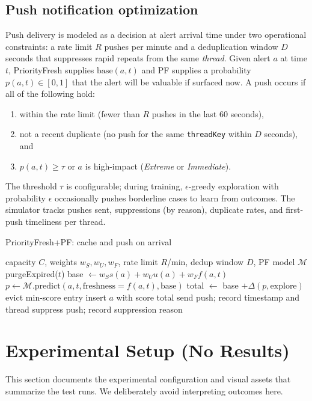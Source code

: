 \documentclass[11pt,twocolumn]{article}
\begin{document}
\subsection{Push notification optimization}
\label{sec:push-optimization}
Push delivery is modeled as a decision at alert arrival time under two operational constraints: a rate limit $R$ pushes per minute and a deduplication window $D$ seconds that suppresses rapid repeats from the same \emph{thread}. Given alert $a$ at time $t$, PriorityFresh supplies $\mathrm{base}(a,t)$ and PF supplies a probability $p(a,t) \in [0,1]$ that the alert will be valuable if surfaced now. A push occurs if all of the following hold:
\begin{enumerate}
        \item within the rate limit (fewer than $R$ pushes in the last 60 seconds),
        \item not a recent duplicate (no push for the same \texttt{threadKey} within $D$ seconds), and
        \item $p(a,t) \ge \tau$ or $a$ is high-impact (\emph{Extreme} or \emph{Immediate}).
\end{enumerate}
The threshold $\tau$ is configurable; during training, $\epsilon$-greedy exploration with probability $\epsilon$ occasionally pushes borderline cases to learn from outcomes. The simulator tracks pushes sent, suppressions (by reason), duplicate rates, and first-push timeliness per thread.

\begin{algorithm}[t]
\caption{PriorityFresh+PF: cache and push on arrival}
\label{alg:pf-priorityfresh}
\begin{algorithmic}[1]
\REQUIRE capacity $C$, weights $w_S,w_U,w_F$, rate limit $R$/min, dedup window $D$, PF model $\mathcal{M}$
\STATE purgeExpired($t$)
\STATE base $\leftarrow w_S s(a)+ w_U u(a)+ w_F f(a,t)$
\STATE $p \leftarrow \mathcal{M}.\text{predict}(a, t, \text{freshness}=f(a,t), \text{base})$
\STATE total $\leftarrow$ base $+ \Delta(p,\text{explore})$
 \STATE evict min-score entry \ENDIF
\STATE insert $a$ with score total
    \STATE send push; record timestamp and thread
\ELSE
    \STATE suppress push; record suppression reason
\ENDIF
\end{algorithmic}
\end{algorithm}

\section{Experimental Setup (No Results)}
This section documents the experimental configuration and visual assets that summarize the test runs. We deliberately avoid interpreting outcomes here.
\end{document}
